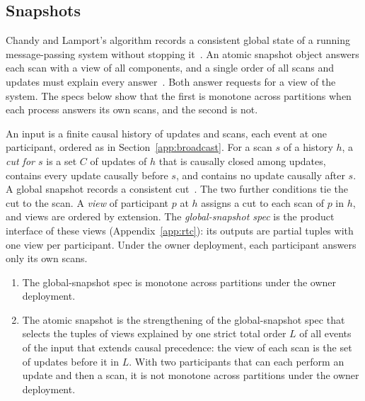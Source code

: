 \subsection{Snapshots}
\label{app:snapshots}

Chandy and Lamport's algorithm records a consistent global state of a running
message-passing system without stopping it~\cite{chandy1985distributed}.  An
atomic snapshot object answers each scan with a view of all components, and a
single order of all scans and updates must explain every
answer~\cite{afek1993atomic}.  Both answer requests for a view of the system.
The specs below show that the first is monotone across partitions when each
process answers its own scans, and the second is not.

An input is a finite causal history of updates and scans, each event at one
participant, ordered as in Section~\ref{app:broadcast}.  For a scan $s$ of a
history $h$, a \emph{cut for $s$} is a set $C$ of updates of $h$ that is
causally closed among updates, contains every update causally before $s$, and
contains no update causally after $s$.  A global snapshot records a
consistent cut~\cite{chandy1985distributed}.  The two further conditions tie
the cut to the scan.  A \emph{view} of participant $p$ at $h$ assigns a cut to
each scan of $p$ in $h$, and views are ordered by extension.  The
\emph{global-snapshot spec} is the product interface of these views
(Appendix~\ref{app:rtc}): its outputs are partial tuples with one view per
participant.  Under the owner deployment, each participant answers only its
own scans.

\begin{proposition}
\label{prop:snapshots}
\leavevmode
\begin{enumerate}
  \item The global-snapshot spec is monotone across partitions under the owner
        deployment.
  \item The atomic snapshot is the strengthening of the global-snapshot spec
        that selects the tuples of views explained by one strict total order
        $L$ of all events of the input that extends causal precedence: the
        view of each scan is the set of updates before it in $L$.  With two
        participants that can each perform an update and then a scan, it is
        not monotone across partitions under the owner deployment.
\end{enumerate}
\end{proposition}

